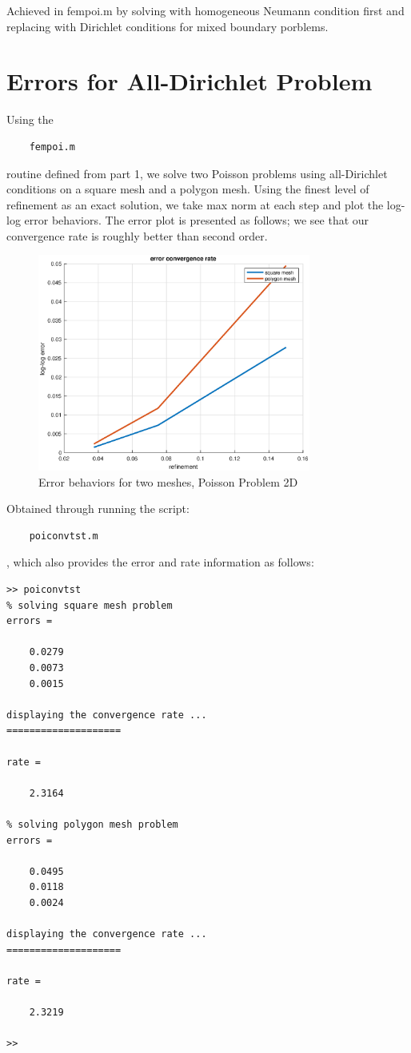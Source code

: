 \documentclass[12pt]{article} %
\begin{document}
Achieved in fempoi.m by solving with homogeneous Neumann condition first and replacing with Dirichlet conditions for mixed boundary porblems.
\newpage

\section{Errors for All-Dirichlet Problem}
Using the
\begin{verbatim}
	fempoi.m
\end{verbatim} routine defined from part 1, we solve two Poisson problems using all-Dirichlet conditions on a square mesh and a polygon mesh. Using the finest level of refinement as an exact solution, we take max norm at each step and plot the log-log error behaviors. The error plot is presented as follows; we see that our convergence rate is roughly better than second order.
\begin{figure}[h!]
 \centering
 \includegraphics[width=0.8\textwidth]{convergence.eps}
 \caption{Error behaviors for two meshes, Poisson Problem 2D}
\end{figure}

\newpage
Obtained through running the script:
\begin{verbatim}
	poiconvtst.m
\end{verbatim}, which also provides the error and rate information as follows:
\begin{verbatim}
>> poiconvtst
% solving square mesh problem
errors =

    0.0279
    0.0073
    0.0015

displaying the convergence rate ...
====================

rate =

    2.3164

% solving polygon mesh problem
errors =

    0.0495
    0.0118
    0.0024

displaying the convergence rate ...
====================

rate =

    2.3219

>> 
\end{verbatim}
\end{document}
